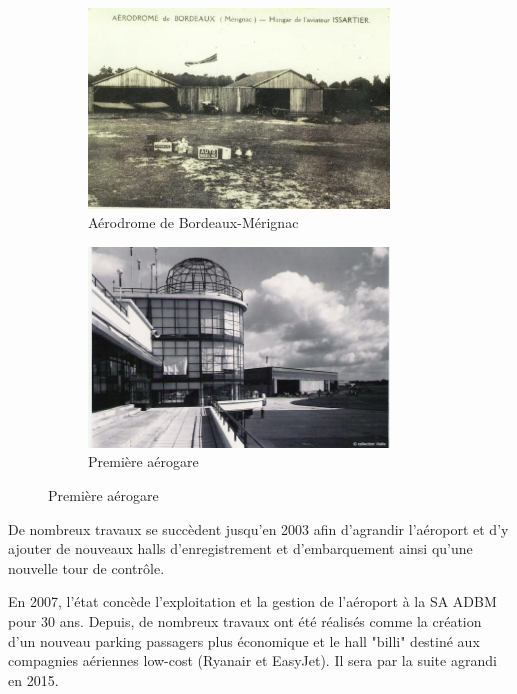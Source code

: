 \begin{figure}[hbt!]
    \begin{subfigure}{0.5\textwidth}
      \centering
      \includegraphics[width=8cm]{Images/premier.jpg}  
      \caption{Aérodrome de Bordeaux-Mérignac}
      \label{fig:aérodrome}
    \end{subfigure}
    \begin{subfigure}{0.5\textwidth}
      \centering
      \includegraphics[width=8cm]{Images/premiere_aerogare.jpg}  
      \caption{Première aérogare}
      \label{fig:premiereAerogare}
    \end{subfigure}
\end{figure}


\newpage
De nombreux travaux se succèdent jusqu'en 2003 afin d'agrandir l'aéroport et d'y ajouter de nouveaux halls d'enregistrement et d'embarquement ainsi qu'une nouvelle tour de contrôle.

En 2007, l'état concède l'exploitation et la gestion de l'aéroport à la SA ADBM pour 30 ans. Depuis, de nombreux travaux ont été réalisés comme la création d'un nouveau parking passagers plus économique et le hall "billi" destiné aux compagnies aériennes low-cost (Ryanair et EasyJet). Il sera par la suite agrandi en 2015.\newline


